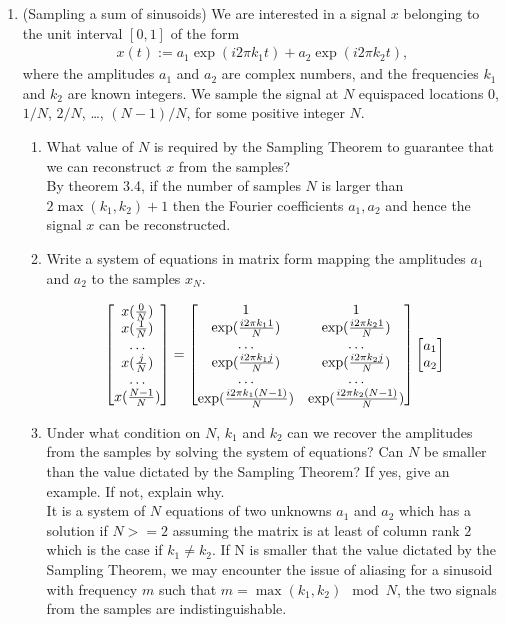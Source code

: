 \documentclass[12pt,twoside]{article}
\begin{document}
\begin{enumerate}
\newpage

\item (Sampling a sum of sinusoids) We are interested in a signal $x$ belonging to the unit interval $[0,1]$ of the form
\begin{align}
x(t) := a_1 \exp (i 2 \pi k_1 t ) + a_2 \exp (i 2 \pi k_2 t ),
\end{align}
where the amplitudes $a_1$ and $a_2$ are complex numbers, and the
frequencies $k_1$ and $k_2$ are known integers.
We sample the signal at $N$ equispaced locations $0$, $1/N$, $2/N$,
\ldots, $(N-1)/N$, for some positive integer $N$.  
\begin{enumerate}
\item What value of $N$ is required by the Sampling Theorem to
  guarantee that we can reconstruct $x$ from the samples? \\
  
 By theorem 3.4, if the number of samples $N$ is larger than $2 \max{(k_1, k_2)} + 1$ then  the Fourier coefficients $a_1,  a_2$ and hence the signal $x$ can
 be reconstructed. 
 
\item Write a system of equations in matrix form mapping the
  amplitudes $a_1$ and $a_2$ to the samples $x_{N}$. 
  
  $$\begin{bmatrix} x(\frac{0}{N}) \\ x(\frac{1}{N}) \\ \ldots \\ x(\frac{j}{N}) \\ \ldots\\ x(\frac{N-1}{N})  \end{bmatrix} 
  	= \begin{bmatrix} 1  & 1 \\  \exp (\frac{i 2 \pi k_1 1} {N} ) & \exp (\frac{i 2 \pi k_2 1} {N} )
	 \\ \ldots &  \ldots \\    \exp (\frac{i 2 \pi k_1 j} {N} ) & \exp (\frac{i 2 \pi k_2 j} {N} ) 
	 \\  \ldots &  \ldots \\    \exp (\frac{i 2 \pi k_1 (N-1)} {N} ) & \exp (\frac{i 2 \pi k_2 (N-1)} {N} )  \end{bmatrix}
	 \begin{bmatrix} a_1 \\ a_2  \end{bmatrix}$$
  
  \item Under what condition on $N$, $k_1$ and $k_2$ can we recover the
  amplitudes from the samples by solving the system of equations? 
  Can $N$ be smaller than the value dictated by the Sampling Theorem?
  If yes, give an example. If not, explain why.  \\
  It is a system of $N$ equations of two unknowns $a_1$ and $a_2$ which has a solution if $N > = 2$ assuming the matrix is at least of column rank $2$ which is
  the case if $k_1 \neq k_2$. If N is smaller that the value dictated by the Sampling Theorem, we may encounter the issue of aliasing for a sinusoid with frequency $m$ such that $m =  \max{(k_1, k_2)} \mod N$,
  the two signals from the samples are indistinguishable.
  

\end{enumerate}
\end{enumerate}
\end{document}
